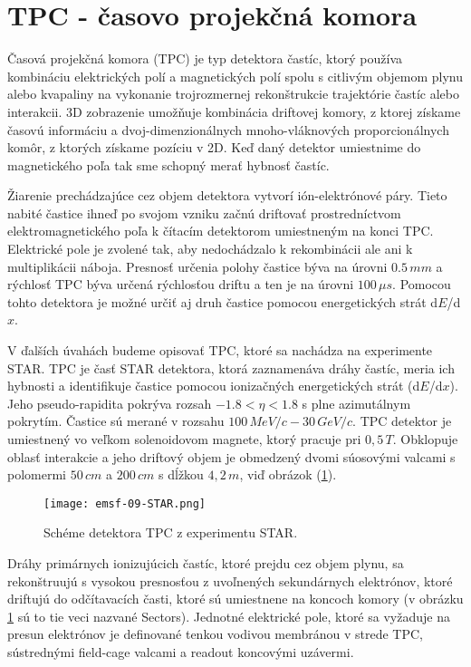 \documentclass[../../main.tex]{subfiles}
\begin{document}
\section{TPC - časovo projekčná komora}
Časová projekčná komora (TPC) je typ detektora častíc, ktorý používa kombináciu elektrických polí a magnetických polí spolu s citlivým objemom plynu alebo kvapaliny na vykonanie trojrozmernej rekonštrukcie trajektórie častíc alebo interakcii. 3D zobrazenie umožňuje kombinácia driftovej komory, z ktorej získame časovú informáciu a dvoj-dimenzionálnych mnoho-vláknových proporcionálnych komôr, z ktorých získame pozíciu v 2D. Keď daný detektor umiestnime do magnetického poľa tak sme schopný merať hybnosť častíc.

Žiarenie prechádzajúce cez objem detektora vytvorí ión-elektrónové páry. Tieto nabité častice ihneď po svojom vzniku začnú driftovať prostredníctvom elektromagnetického poľa k čítacím detektorom umiestneným na konci TPC. Elektrické pole je zvolené tak, aby nedochádzalo k rekombinácii ale ani k multiplikácii náboja. Presnosť určenia polohy častice býva na úrovni $0.5\,\unit{mm}$ a rýchlosť TPC býva určená rýchlosťou driftu a ten je na úrovni $100\,\unit{\mu s}$. Pomocou tohto detektora je možné určiť aj druh častice pomocou energetických strát d$E$/d$x$.

V ďalších úvahách budeme opisovať TPC, ktoré sa nachádza na experimente STAR. TPC je časť STAR detektora, ktorá zaznamenáva dráhy častíc, meria ich hybnosti a identifikuje častice pomocou ionizačných energetických strát (d$E$/d$x$). Jeho pseudo-rapidita pokrýva rozsah $-1.8 < \eta <1.8$ s plne azimutálnym pokrytím. Častice sú merané v rozsahu $100\,\unit{MeV}/c - 30\,\unit{GeV}/c$. TPC detektor je umiestnený vo veľkom solenoidovom magnete, ktorý pracuje pri $0,5\,\unit{T}$. Obklopuje oblasť interakcie a jeho driftový objem je obmedzený dvomi súosovými valcami s polomermi $50\,\unit{cm}$ a $200\,\unit{cm}$ s dĺžkou $4,2\,\unit{m}$, viď obrázok (\ref{em9:fig:STAR}). 

\begin{figure}[!h]
\texttt{[image: emsf-09-STAR.png]}
\centering
\caption{Schéme detektora TPC z experimentu STAR.}
\label{em9:fig:STAR}
\end{figure}

Dráhy primárnych ionizujúcich častíc, ktoré prejdu cez objem plynu, sa rekonštruujú s vysokou presnosťou z uvoľnených sekundárnych elektrónov, ktoré driftujú do odčítavacích časti, ktoré sú umiestnene na koncoch komory (v obrázku \ref{em9:fig:STAR} sú to tie veci nazvané Sectors). Jednotné elektrické pole, ktoré sa vyžaduje na presun elektrónov je definované tenkou vodivou membránou v strede TPC, sústrednými field-cage valcami a readout koncovými uzávermi.
\end{document}
